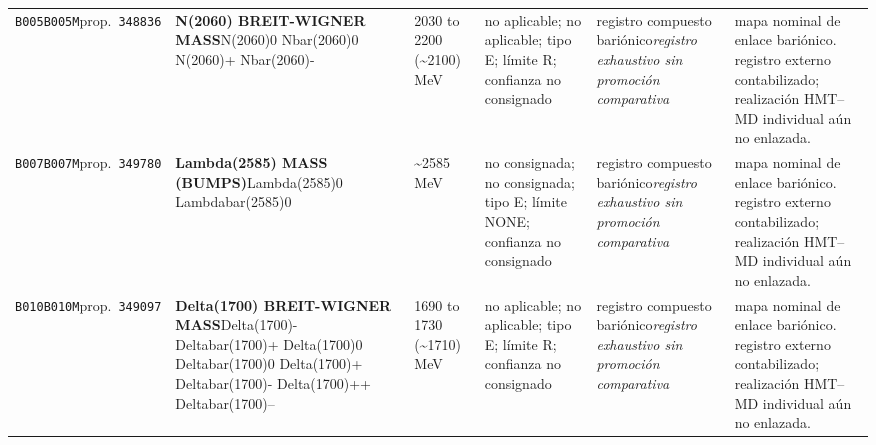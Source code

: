 \begin{landscape}
\begin{longtable}{L{1.85cm}L{4.45cm}L{2.35cm}L{4.05cm}L{3.35cm}L{7.15cm}}
\texttt{B005}\newline \texttt{B005M}\newline prop.\ \texttt{348836} & \textbf{N(2060) BREIT-WIGNER MASS}\newline N(2060)0 \textbar{}\allowbreak{} Nbar(2060)0 \textbar{}\allowbreak{} N(2060)+ \textbar{}\allowbreak{} Nbar(2060)- & 2030 to 2200 (\textasciitilde{}2100)\,MeV & no aplicable; no aplicable; tipo E; límite R; confianza no consignado & registro compuesto bariónico\newline \emph{registro exhaustivo sin promoción comparativa} & mapa nominal de enlace bariónico. registro externo contabilizado; realización HMT--MD individual aún no enlazada. \\
\texttt{B007}\newline \texttt{B007M}\newline prop.\ \texttt{349780} & \textbf{Lambda(2585) MASS (BUMPS)}\newline Lambda(2585)0 \textbar{}\allowbreak{} Lambdabar(2585)0 & \textasciitilde{}2585\,MeV & no consignada; no consignada; tipo E; límite NONE; confianza no consignado & registro compuesto bariónico\newline \emph{registro exhaustivo sin promoción comparativa} & mapa nominal de enlace bariónico. registro externo contabilizado; realización HMT--MD individual aún no enlazada. \\
\texttt{B010}\newline \texttt{B010M}\newline prop.\ \texttt{349097} & \textbf{Delta(1700) BREIT-WIGNER MASS}\newline Delta(1700)- \textbar{}\allowbreak{} Deltabar(1700)+ \textbar{}\allowbreak{} Delta(1700)0 \textbar{}\allowbreak{} Deltabar(1700)0 \textbar{}\allowbreak{} Delta(1700)+ \textbar{}\allowbreak{} Deltabar(1700)- \textbar{}\allowbreak{} Delta(1700)++ \textbar{}\allowbreak{} Deltabar(1700)-- & 1690 to 1730 (\textasciitilde{}1710)\,MeV & no aplicable; no aplicable; tipo E; límite R; confianza no consignado & registro compuesto bariónico\newline \emph{registro exhaustivo sin promoción comparativa} & mapa nominal de enlace bariónico. registro externo contabilizado; realización HMT--MD individual aún no enlazada. \\

\end{longtable}
\end{landscape}
